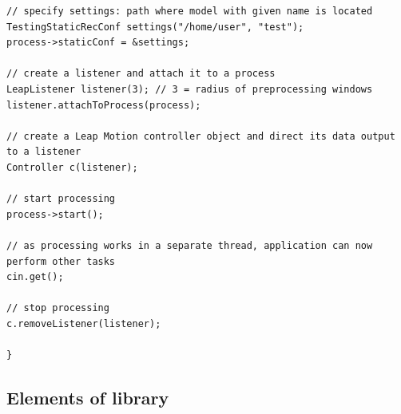 \begin{lstlisting}
// specify settings: path where model with given name is located
TestingStaticRecConf settings("/home/user", "test");
process->staticConf = &settings;

// create a listener and attach it to a process
LeapListener listener(3); // 3 = radius of preprocessing windows
listener.attachToProcess(process);

// create a Leap Motion controller object and direct its data output to a listener
Controller c(listener);

// start processing
process->start();

// as processing works in a separate thread, application can now perform other tasks
cin.get();

// stop processing
c.removeListener(listener);

}
\end{lstlisting}

\subsection{Elements of library}

